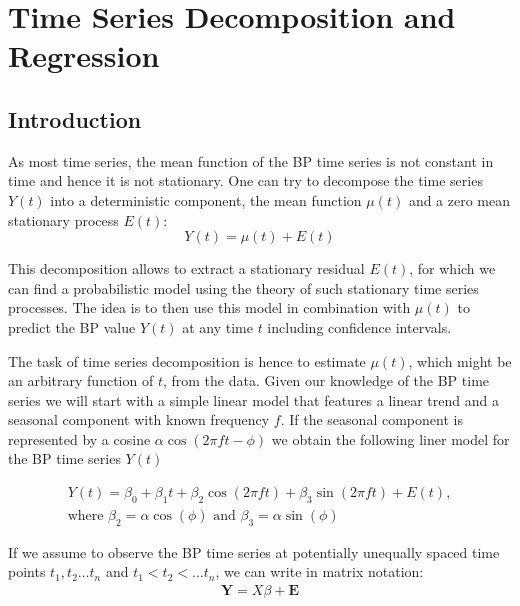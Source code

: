 

\chapter{Time Series Decomposition and Regression}


\section{Introduction}

As most time series, the mean function of the BP time series is not constant in time and hence it is not stationary.
One can try to decompose the time series $Y(t)$ into a deterministic component, the mean function $\mu(t)$
and a zero mean stationary process $E(t)$:
\[ Y(t)= \mu(t) + E(t) \]

This decomposition allows to extract a stationary residual $E(t)$, for which we can find a probabilistic model
using the theory of such stationary time series processes. The idea is to then use this model in combination
with $\mu(t)$ to predict the BP value $Y(t)$ at any time $t$ including confidence intervals.

The task of time series decomposition is hence to estimate $\mu(t)$, which might be an arbitrary function of $t$, from the data.
Given our knowledge of the BP time series we will start with a simple linear model that
features a linear trend and a seasonal component with known frequency $f$.
If the seasonal component is represented by a cosine $\alpha \cos(2 \pi f t - \phi)$ we obtain the
following liner model for the BP time series $Y(t)$

\begin{gather*}
Y(t) = \beta_0 + \beta_1 t + \beta_2 \cos(2 \pi f t) + \beta_3 \sin(2 \pi f t) + E(t), \\
\text{where $\beta_2 = \alpha \cos(\phi)$ and $\beta_3 = \alpha \sin(\phi)$}
\end{gather*}

If we assume to observe the BP time series at potentially unequally spaced
time points $t_1, t_2 \dots t_n$ and $t_1 < t_2 < \dots t_n$, we can write in matrix notation:
\begin{gather*}
\mathbf{Y} = X \beta + \mathbf{E}
\end{gather*}

